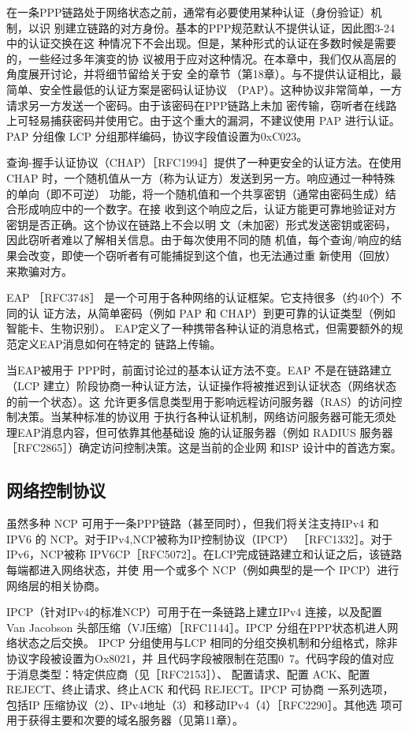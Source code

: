 在一条PPP链路处于网络状态之前，通常有必要使用某种认证（身份验证）机制，以识
别建立链路的对方身份。基本的PPP规范默认不提供认证，因此图3-24中的认证交换在这
种情况下不会出现。但是，某种形式的认证在多数时候是需要的，一些经过多年演变的协
议被用于应对这种情况。在本章中，我们仅从高层的角度展开讨论，并将细节留给关于安
全的章节（第18章）。与不提供认证相比，最简单、安全性最低的认证方案是密码认证协议
（PAP）。这种协议非常简单，一方请求另一方发送一个密码。由于该密码在PPP链路上未加
密传输，窃听者在线路上可轻易捕获密码并使用它。由于这个重大的漏洞，不建议使用 PAP
进行认证。PAP 分组像 LCP 分组那样编码，协议字段值设置为0xC023。

查询-握手认证协议（CHAP）［RFC1994］提供了一种更安全的认证方法。在使用 CHAP
时，一个随机值从一方（称为认证方）发送到另一方。响应通过一种特殊的单向（即不可逆）
功能，将一个随机值和一个共享密钥（通常由密码生成）结合形成响应中的一个数字。在接
收到这个响应之后，认证方能更可靠地验证对方密钥是否正确。这个协议在链路上不会以明
文（未加密）形式发送密钥或密码，因此窃听者难以了解相关信息。由于每次使用不同的随
机值，每个查询/响应的结果会改变，即使一个窃听者有可能捕捉到这个值，也无法通过重
新使用（回放）来欺骗对方。

EAP ［RFC3748］ 是一个可用于各种网络的认证框架。它支持很多（约40个）不同的认
证方法，从简单密码（例如 PAP 和 CHAP）到更可靠的认证类型（例如智能卡、生物识别）。
EAP定义了一种携带各种认证的消息格式，但需要额外的规范定义EAP消息如何在特定的
链路上传输。

当EAP被用于 PPP时，前面讨论过的基本认证方法不变。EAP 不是在链路建立（LCP
建立）阶段协商一种认证方法，认证操作将被推迟到认证状态（网络状态的前一个状态）。这
允许更多信息类型用于影响远程访问服务器（RAS）的访问控制决策。当某种标准的协议用
于执行各种认证机制，网络访问服务器可能无须处理EAP消息内容，但可依靠其他基础设
施的认证服务器（例如 RADIUS 服务器［RFC2865］）确定访问控制决策。这是当前的企业网
和ISP 设计中的首选方案。

\subsection{网络控制协议}

虽然多种 NCP 可用于一条PPP链路（甚至同时），但我们将关注支持IPv4 和IPV6 的
NCP。对于IPv4,NCP被称为IP控制协议（IPCP） ［RFC1332］。对于 IPv6，NCP被称
IPV6CP［RFC5072］。在LCP完成链路建立和认证之后，该链路每端都进入网络状态，并使
用一个或多个 NCP（例如典型的是一个 IPCP）进行网络层的相关协商。

IPCP（针对IPv4的标准NCP）可用于在一条链路上建立IPv4 连接，以及配置 Van
Jacobson 头部压缩（VJ压缩）［RFC1144］。IPCP 分组在PPP状态机进人网络状态之后交换。
IPCP 分组使用与LCP 相同的分组交换机制和分组格式，除非协议字段被设置为Ox8021，并
且代码字段被限制在范围0~7。代码字段的值对应于消息类型：特定供应商（见［RFC2153］）、
配置请求、配置 ACK、配置 REJECT、终止请求、终止ACK 和代码 REJECT。IPCP 可协商
一系列选项，包括IP 压缩协议（2）、IPv4地址（3）和移动IPv4（4）［RFC2290］。其他选
项可用于获得主要和次要的域名服务器（见第11章）。

